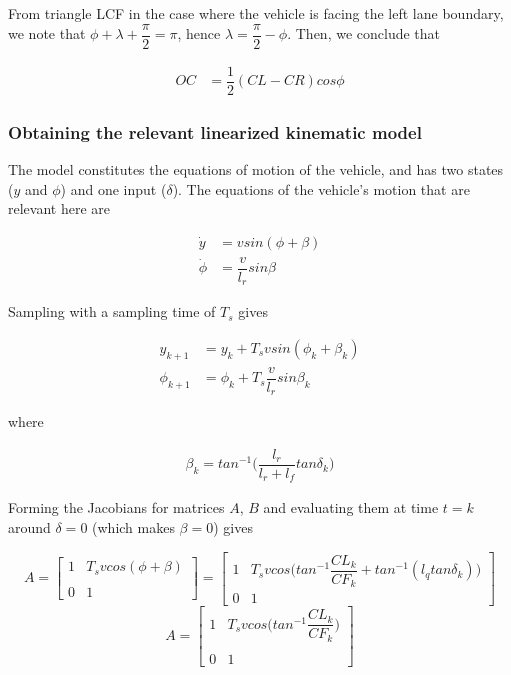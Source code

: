 From triangle LCF in the case where the vehicle is facing the left lane boundary,
we note that $\phi + \lambda + \dfrac{\pi}{2} = \pi$,
hence $\lambda = \dfrac{\pi}{2} - \phi$. Then, we conclude that

\begin{align}
  OC &= \dfrac{1}{2}(CL - CR) cos\phi
\end{align}




\subsubsection{Obtaining the relevant linearized kinematic model}

The model constitutes the equations of motion of the vehicle, and has two
states ($y$ and $\phi$) and one input ($\delta$). The equations of the
vehicle's motion that are relevant here are

\begin{align}
  \dot{y} &= v sin(\phi + \beta) \\
  \dot{\phi} &= \dfrac{v}{l_r} sin\beta
\end{align}

Sampling with a sampling time of $T_s$ gives

\begin{align}
  y_{k+1} &= y_{k} + T_s v sin(\phi_k + \beta_k) \\
  \phi_{k+1} &= \phi_{k} + T_s \dfrac{v}{l_r} sin\beta_k
\end{align}

where

\begin{align}
  \beta_k = tan^{-1}\Big(\dfrac{l_r}{l_r + l_f} tan\delta_k\Big)
\end{align}


Forming the Jacobians for matrices $A$, $B$ and evaluating them at time
$t=k$ around $\delta = 0$ (which makes $\beta = 0$) gives

\begin{equation}
 A =
  \begin{bmatrix}
    1 & T_s v cos(\phi + \beta) \\\\
    0 & 1
  \end{bmatrix}
  =
  \begin{bmatrix}
    1 & T_s v cos\Big(tan^{-1}\dfrac{CL_k}{CF_k} + tan^{-1} (l_q tan\delta_k)\Big) \\
    0 & 1
  \end{bmatrix}
\end{equation}
\begin{equation}
 A =
  \begin{bmatrix}
    1 & T_s v cos\Big(tan^{-1}\dfrac{CL_k}{CF_k}\Big) \\\\
    0 & 1
  \end{bmatrix}
\end{equation}

